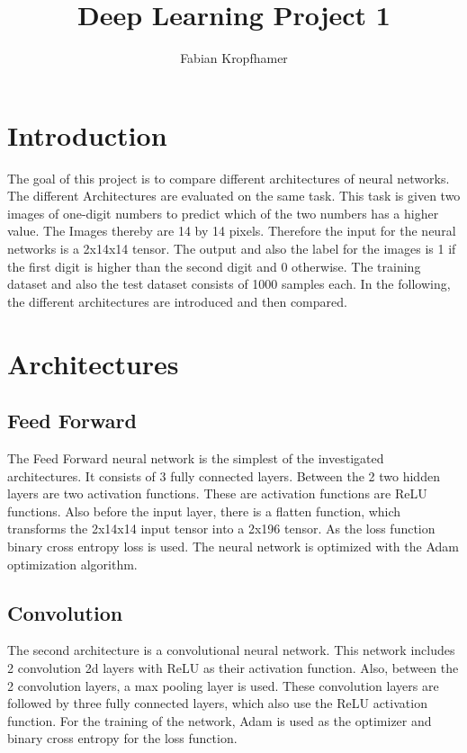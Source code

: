 \documentclass[12pt]{article}
\title{
	Deep Learning Project 1
}
\author{Fabian Kropfhamer}
\begin{document}
\maketitle

\section{Introduction}
The goal of this project is to compare different architectures of neural networks.
The different Architectures are evaluated on the same task.
This task is given two images of one-digit numbers to predict which of the two numbers has a higher value.
The Images thereby are 14 by 14 pixels.
Therefore the input for the neural networks is a 2x14x14 tensor.
The output and also the label for the images is 1 if the first digit is higher than the second digit and 0 otherwise.
The training dataset and also the test dataset consists of 1000 samples each.
In the following, the different architectures are introduced and then compared.  
\section{Architectures}
\subsection{Feed Forward}
The Feed Forward neural network is the simplest of the investigated architectures.
It consists of 3 fully connected layers.
Between the 2 two hidden layers are two activation functions.
These are activation functions are ReLU functions.
Also before the input layer, there is a flatten function, which transforms the 2x14x14 input tensor into a 2x196 tensor.
As the loss function binary cross entropy loss is used.
The neural network is optimized with the Adam optimization algorithm.
\subsection{Convolution}
The second architecture is a convolutional neural network.
This network includes 2 convolution 2d layers with ReLU as their activation function.
Also, between the 2 convolution layers, a max pooling layer is used.
These convolution layers are followed by three fully connected layers, which also use the ReLU activation function.
For the training of the network, Adam is used as the optimizer and binary cross entropy for the loss function.
\end{document}
